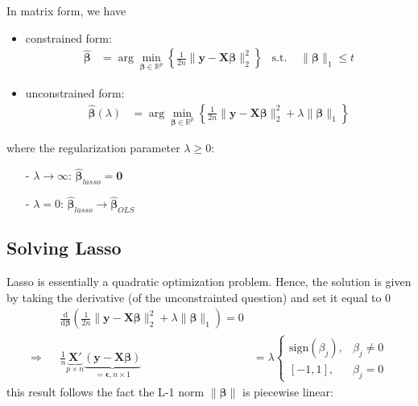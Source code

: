 \documentclass[twoside]{article}
\begin{document}
In matrix form, we have
\begin{itemize}
    \item constrained form:
    \begin{align*}
        \hat{\boldsymbol{\beta}} &= \arg\min_{\boldsymbol{\beta}\in \mathbb{R}^p}\left\{ \frac{1}{2n} \lVert \mathbf{y}-\mathbf{X}\boldsymbol{\beta} \rVert^2_2 \right\} & \text{s.t.\ } & \lVert \boldsymbol{\beta} \rVert_1 \leq t
    \end{align*}
    \item unconstrained form:
    \begin{align*}
        \hat{\boldsymbol{\beta}}(\lambda) &= \arg\min_{\boldsymbol{\beta}\in \mathbb{R}^p}\left\{ \frac{1}{2n} \lVert \mathbf{y}-\mathbf{X}\boldsymbol{\beta} \rVert^2_2 +\lambda \lVert \boldsymbol{\beta} \rVert_1 \right\}
    \end{align*}
\end{itemize}
where the regularization parameter $\lambda \geq 0$:
\begin{itemize}
    \item[-] $\lambda \rightarrow \infty$: $\hat{\boldsymbol{\beta}}_{lasso}=\mathbf{0}$
    \item[-] $\lambda = 0$: $\hat{\boldsymbol{\beta}}_{lasso} \rightarrow\hat{\boldsymbol{\beta}}_{OLS}$
\end{itemize}

\subsection{Solving Lasso}
Lasso is essentially a quadratic optimization problem. Hence, the solution is given by taking the derivative (of the unconstrainted question) and set it equal to 0
\begin{align*}
   && \frac{\mathrm{d}}{\mathrm{d}\boldsymbol{\beta}} \left( \frac{1}{2n} \lVert \mathbf{y}-\mathbf{X}\boldsymbol{\beta} \rVert^2_2 +\lambda \lVert \boldsymbol{\beta} \rVert_1 \right) = 0 \\
   \Rightarrow && \frac{1}{n} \underbrace{\mathbf{X}'}_{p\times n} \underbrace{ \left(\mathbf{y}-\mathbf{X}\boldsymbol{\beta} \right)}_{=\boldsymbol{\epsilon}, n \times 1} &= \lambda \begin{cases}
    \mathrm{sign}\left(\beta_j\right), & \beta_j\neq 0\\
    \left[ -1,1 \right], & \beta_j =0
   \end{cases}
\end{align*}
this result follows the fact the L-1 norm $\lVert \boldsymbol{\beta} \rVert$ is piecewise linear:
\end{document}

